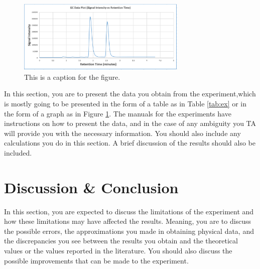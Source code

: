 \documentclass[10pt]{article}
\begin{document}
\begin{figure}[ht]
    \centering
    \includegraphics[width=0.72\textwidth]{example_figure.png}
    \caption{This is a caption for the figure.}
    \label{fig:ex}
\end{figure}

In this section, you are to present the data you obtain from the experiment,which is mostly going to be presented in the form of a table as in Table \ref{tab:ex} or in the form of a graph as in Figure \ref{fig:ex}. The manuals for the experiments have instructions on how to present the data, and in the case of any ambiguity you TA will provide you with the necessary information. You should also include any calculations you do in this section. A brief discussion of the results should also be included.

\section{Discussion \& Conclusion}

In this section, you are expected to discuss the limitations of the experiment and how these limitations may have affected the results. Meaning, you are to discuss the possible errors, the approximations you made in obtaining physical data, and the discrepancies you see between the results you obtain and the theoretical values or the values reported in the literature. You should also discuss the possible improvements that can be made to the experiment. 

\printbibliography

\end{document}
